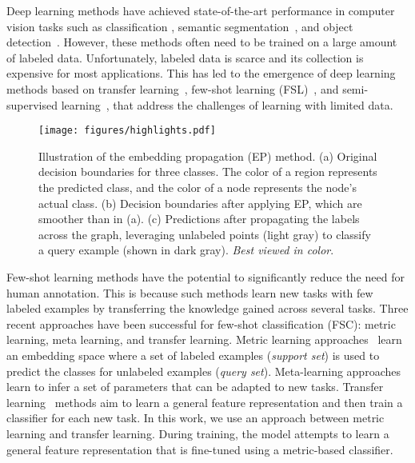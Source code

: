 \documentclass[runningheads]{llncs}
\begin{document}
Deep learning methods have achieved state-of-the-art performance in computer vision tasks such as classification \cite{krizhevsky2012Imagenet}, semantic segmentation~\cite{long2015fully}, and object detection~\cite{ren2015faster}. However, these methods often need to be trained on a large amount of labeled data. Unfortunately, labeled data is scarce and its collection is expensive for most applications. This has led to the emergence of deep learning methods based on transfer learning~\cite{yosinski2014transferable}, few-shot learning (FSL)~\cite{fei2006one}, and semi-supervised learning~\cite{chapelle2005semi}, that address the challenges of learning with limited data.

\begin{figure}
    \centering
    \texttt{[image: figures/highlights.pdf]}
    \caption{Illustration of the embedding propagation (EP) method. (a) Original decision boundaries for three classes. The color of a region represents the predicted class, and the color of a node represents the node's actual class. (b) Decision boundaries after applying EP, which are smoother than in (a). (c) Predictions after propagating the labels across the graph, leveraging unlabeled points (light gray) to classify a query example (shown in dark gray). \textit{Best viewed in color}.}
    \label{fig:embeddingprop-sketch}


\end{figure}

Few-shot learning methods have the potential to significantly reduce the need for human annotation. This is because such methods learn new tasks with few labeled examples by transferring the knowledge gained across several tasks.
Three recent approaches have been successful for few-shot classification (FSC): metric learning, meta learning, and transfer learning. Metric learning approaches~\cite{vinyals2016matching,snell2017prototypical} learn an embedding space where a set of labeled examples (\textit{support set}) is used to predict the classes for unlabeled examples (\textit{query set}). Meta-learning approaches~\cite{finn2017model,rusu2018meta} learn to infer a set of parameters that can be adapted to new tasks. Transfer learning~\cite{chen2018a,mangla2019charting} methods aim to learn a general feature representation and then train a classifier for each new task. In this work, we use an approach between metric learning and transfer learning. During training, the model attempts to learn a general feature representation that is fine-tuned using a metric-based classifier.
\end{document}
